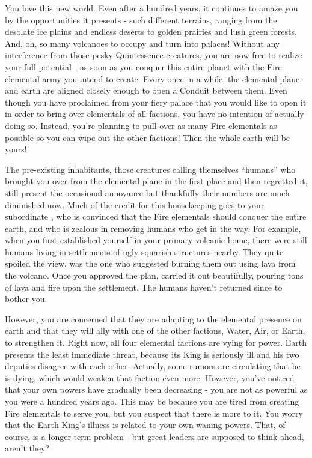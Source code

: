 \documentclass[char]{elementals}
\begin{document}
\name{\cQueen{}}

You love this new world.  Even after a hundred years, it continues to amaze you by the opportunities it presents - such different terrains, ranging from the desolate ice plains and endless deserts to golden prairies and lush green forests.  And, oh, so many volcanoes to occupy and turn into palaces!  Without any interference from those pesky Quintessence creatures, you are now free to realize your full potential - as soon as you conquer this entire planet with the Fire elemental army you intend to create.  Every once in a while, the elemental plane and earth are aligned closely enough to open a Conduit between them.  Even though you have proclaimed from your fiery palace that you would like to open it in order to bring over elementals of all factions, you have no intention of actually doing so.  Instead, you're planning to pull over as many Fire elementals as possible so you can wipe out the other factions!  Then the whole earth will be yours!

The pre-existing inhabitants, those creatures calling themselves ``humans'' who brought you over from the elemental plane in the first place and then regretted it, still present the occasional annoyance but thankfully their numbers are much diminished now.  Much of the credit for this housekeeping goes to your subordinate \cPyro{\intro}, who is convinced that the Fire elementals should conquer the entire earth, and who is zealous in removing humans who get in the way.  For example, when you first established yourself in your primary volcanic home, there were still humans living in settlements of ugly squarish structures nearby.  They quite spoiled the view.  \cPyro{} was the one who suggested burning them out using lava from the volcano.  Once you approved the plan, \cPyro{\they} carried it out beautifully, pouring tons of lava and fire upon the settlement.  The humans haven't returned since to bother you.

However, you are concerned that they are adapting to the elemental presence on earth and that they will ally with one of the other factions, Water, Air, or Earth, to strengthen it.  Right now, all four elemental factions are vying for power.  Earth presents the least immediate threat, because its King is seriously ill and his two deputies disagree with each other.  Actually, some rumors are circulating that he is dying, which would weaken that faction even more.  However, you've noticed that your own powers have gradually been decreasing - you are not as powerful as you were a hundred years ago.  This may be because you are tired from creating Fire elementals to serve you, but you suspect that there is more to it.  You worry that the Earth King's illness is related to your own waning powers.  That, of course, is a longer term problem - but great leaders are supposed to think ahead, aren't they?
\end{document}
